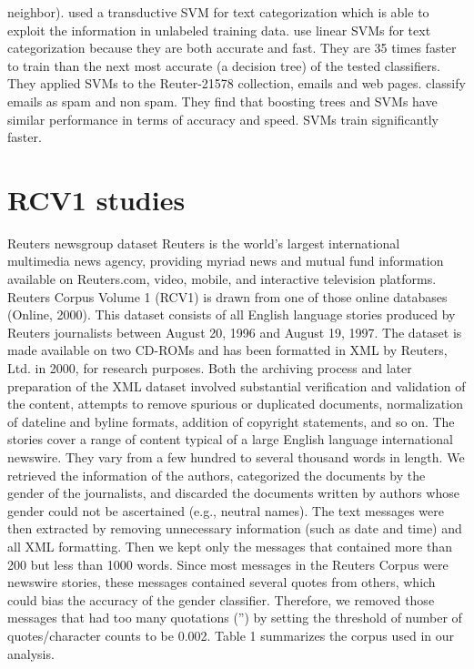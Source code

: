neighbor). \citeauthor{joachims1999transductive} \cite{joachims1999transductive} used a transductive SVM for text categorization which is able to exploit the information in unlabeled training data.
\citeauthor{dumais1998inductive} \cite{dumais1998inductive} use linear SVMs for text categorization because they are both accurate and fast. They are 35 times faster to train than the next most accurate (a decision tree) of the tested classifiers. They applied SVMs to the Reuter-21578 collection, emails and web pages.
\citeauthor{drucker1999support} \cite{drucker1999support} classify emails as spam and non spam. They find that boosting trees and SVMs have similar performance in terms of accuracy and speed. SVMs train significantly faster.

\section{RCV1 studies}
\cite{cheng2011author}
Reuters newsgroup dataset
Reuters is the world’s largest international multimedia news
agency, providing myriad news and mutual fund information
available on Reuters.com, video, mobile, and interactive television platforms. Reuters Corpus Volume 1 (RCV1) is drawn
from one of those online databases (Online, 2000). This dataset
consists of all English language stories produced by Reuters
journalists between August 20, 1996 and August 19, 1997. The
dataset is made available on two CD-ROMs and has been
formatted in XML by Reuters, Ltd. in 2000, for research
purposes. Both the archiving process and later preparation of
the XML dataset involved substantial verification and validation of the content, attempts to remove spurious or duplicated
documents, normalization of dateline and byline formats,
addition of copyright statements, and so on. The stories cover
a range of content typical of a large English language international newswire. They vary from a few hundred to several
thousand words in length.
We retrieved the information of the authors, categorized
the documents by the gender of the journalists, and discarded
the documents written by authors whose gender could not be
ascertained (e.g., neutral names). The text messages were
then extracted by removing unnecessary information (such as
date and time) and all XML formatting. Then we kept only the
messages that contained more than 200 but less than 1000
words. Since most messages in the Reuters Corpus were
newswire stories, these messages contained several quotes
from others, which could bias the accuracy of the gender
classifier. Therefore, we removed those messages that had too
many quotations (”) by setting the threshold of number of
quotes/character counts to be 0.002. Table 1 summarizes the
corpus used in our analysis.

